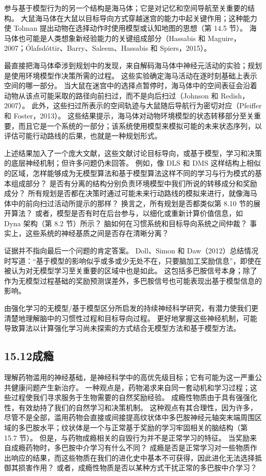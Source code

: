 \documentclass[UTF8, 12pt, fontset=fandol, oneside]{ctexart}
\begin{document}
参与基于模型行为的另一个结构是海马体；它是对记忆和空间导航至关重要的结构。
大鼠海马体在大鼠以目标导向方式穿越迷宫的能力中起关键作用；这种能力使 Tolman 提出动物在选择动作时使用模型或认知地图的思想（第 14.5 节）。
海马体也可能是人类想象新经验能力的关键组成部分（Hassabis 和 Maguire，2007；Ólafsdóttir、Barry、Saleem、Hassabis 和 Spiers，2015）。

最直接把海马体牵涉到规划中的发现，来自解码海马体中神经元活动的实验；规划是使用环境模型作决策所需的过程。
这些实验确定海马活动在逐时刻基础上表示空间的哪一部分。
当大鼠在迷宫中的选择点暂停时，海马体中的空间表征会沿着动物从该点可能采取的路径向前扫过，而不是向后扫过（Johnson 和 Redish，2007）。
此外，这些扫过所表示的空间轨迹与大鼠随后导航行为密切对应（Pfeiffer 和 Foster，2013）。
这些结果提示，海马体对动物环境模型的状态转移部分至关重要，而且它是一个系统的一部分；该系统使用模型来模拟可能的未来状态序列，以评估可能行动路线的后果，也就是一种规划形式。

上述结果加入了一个庞大文献，这些文献讨论目标导向，或基于模型，学习和决策的底层神经机制；但许多问题仍未回答。
例如，像 DLS 和 DMS 这样结构上相似的区域，怎样能够成为无模型算法和基于模型算法这样不同的学习与行为模式的基本组成部分？
是否有分离的结构分别负责环境模型中我们所说的转移成分和奖励成分？
所有规划是否都在决策时通过可能未来行动路线的模拟来进行，就像海马体中的前向扫过活动所提示的那样？
换言之，所有规划是否都类似第 8.10 节的展开算法？
或者，模型是否有时在后台参与，以细化或重新计算价值信息，如 Dyna 架构（第 8.2 节）所示？
脑如何在习惯系统和目标导向系统之间仲裁？
事实上，这些系统的神经基质之间是否存在清晰分离？

证据并不指向最后一个问题的肯定答案。
Doll、Simon 和 Daw（2012）总结情况时写道：“基于模型的影响似乎或多或少无处不在，只要脑加工奖励信息”，即使在被认为对无模型学习至关重要的区域中也是如此。
这包括多巴胺信号本身；除了作为无模型过程基础的奖励预测误差外，多巴胺信号也可能表现出基于模型信息的影响。

由强化学习的无模型/基于模型区分所启发的持续神经科学研究，有潜力使我们更清楚地理解脑中的习惯性过程和目标导向过程。
更好地掌握这些神经机制，可能导致算法以计算强化学习尚未探索的方式结合无模型方法和基于模型方法。

\subsection*{15.12\quad 成瘾}

理解药物滥用的神经基础，是神经科学中的高优先级目标；它有可能为这一严重公共健康问题产生新治疗。
一种观点是，药物渴求来自同一套动机和学习过程；这些过程使我们寻求服务于生物需要的自然奖励经验。
成瘾性物质由于具有强强化性，有效劫持了我们的自然学习和决策机制。
这种观点有其合理性，因为许多，尽管不是全部，滥用药物会直接或间接提高纹状体中多巴胺神经元轴突末端周围区域的多巴胺水平；纹状体是一个与正常基于奖励的学习牢固相关的脑结构（第 15.7 节）。
但是，与药物成瘾相关的自毁行为并不是正常学习的特征。
当奖励来自成瘾药物时，多巴胺中介学习有什么不同？
成瘾是否是正常学习对一些物质作出响应的结果，而这些物质在我们的进化史中基本不可获得，因此进化无法选择抵御其损害作用？
或者，成瘾性物质是否以某种方式干扰正常的多巴胺中介学习？
\end{document}
